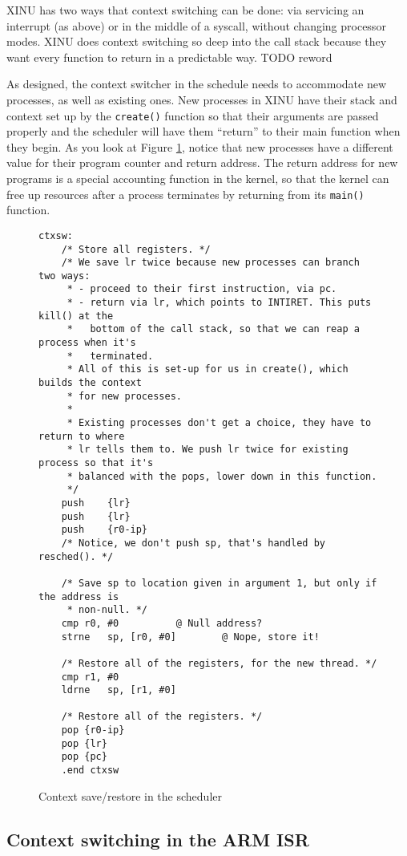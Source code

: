 \documentclass[12pt]{article}
\newcommand{\TODO}[1]{{\huge\color{red}TODO \Large #1}}
\newcommand{\code}[1]{{\tt #1}}
\begin{document}
XINU has two ways that context switching can be done: via servicing an
interrupt (as above) or in the middle of a syscall, without changing processor
modes. XINU does context switching so deep into the call stack because they
want every function to return in a predictable way. \TODO{reword}

As designed, the context switcher in the schedule needs to accommodate new
processes, as well as existing ones. New processes in XINU have their stack and
context set up by the \code{create()} function so that their arguments are
passed properly and the scheduler will have them ``return'' to their main
function when they begin. As you look at Figure \ref{ctxsw}, notice that new
processes have a different value for their program counter and return address.
The return address for new programs is a special accounting function in the
kernel, so that the kernel can free up resources after a process terminates by
returning from its \code{main()} function.

\begin{figure}
\caption{Context save/restore in the scheduler}
\label{ctxsw}
\small
\begin{verbatim}
ctxsw:
	/* Store all registers. */
	/* We save lr twice because new processes can branch two ways:
	 * - proceed to their first instruction, via pc.
	 * - return via lr, which points to INTIRET. This puts kill() at the
	 *   bottom of the call stack, so that we can reap a process when it's
	 *   terminated.
	 * All of this is set-up for us in create(), which builds the context
	 * for new processes.
	 *
	 * Existing processes don't get a choice, they have to return to where
	 * lr tells them to. We push lr twice for existing process so that it's
	 * balanced with the pops, lower down in this function.
	 */
	push	{lr}
	push	{lr}
	push	{r0-ip}
	/* Notice, we don't push sp, that's handled by resched(). */

	/* Save sp to location given in argument 1, but only if the address is
	 * non-null. */
	cmp	r0, #0			@ Null address?
	strne	sp, [r0, #0]		@ Nope, store it!

	/* Restore all of the registers, for the new thread. */
	cmp	r1, #0
	ldrne	sp, [r1, #0]

	/* Restore all of the registers. */
	pop	{r0-ip}
	pop	{lr}
	pop	{pc}
	.end ctxsw
\end{verbatim}
\end{figure}

\subsection{Context switching in the ARM ISR}
\end{document}

